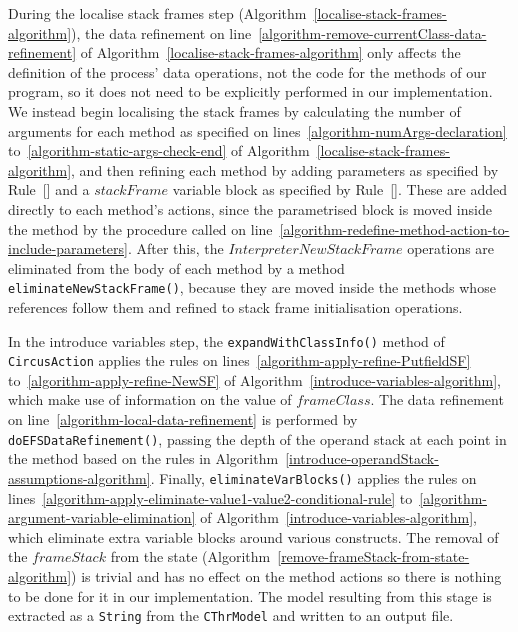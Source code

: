 During the localise stack frames step
(Algorithm~\ref{localise-stack-frames-algorithm}), the data refinement
on line~\ref{algorithm-remove-currentClass-data-refinement} of
Algorithm~\ref{localise-stack-frames-algorithm} only affects the
definition of the process' data operations, not the \Circus{} code for
the methods of our program, so it does not need to be explicitly
performed in our implementation.
We instead begin localising the stack frames by calculating the number
of arguments for each method as specified on
lines~\ref{algorithm-numArgs-declaration}
to~\ref{algorithm-static-args-check-end} of
Algorithm~\ref{localise-stack-frames-algorithm}, and then refining
each method by adding parameters as specified by
Rule~[] and a $stackFrame$
variable block as specified by
Rule~[].
These are added directly to each method's actions, since the
parametrised block is moved inside the method by the procedure called
on line~\ref{algorithm-redefine-method-action-to-include-parameters}.
After this, the $InterpreterNewStackFrame$ operations are eliminated
from the body of each method by a method
\texttt{eliminateNewStackFrame()}, because they are moved inside
the methods whose references follow them and refined to stack frame
initialisation operations.

In the introduce variables step, the \texttt{expandWithClassInfo()}
method of \texttt{CircusAction} applies the rules on
lines~\ref{algorithm-apply-refine-PutfieldSF}
to~\ref{algorithm-apply-refine-NewSF} of
Algorithm~\ref{introduce-variables-algorithm}, which make use of
information on the value of $frameClass$.
The data refinement on line~\ref{algorithm-local-data-refinement} is
performed by \texttt{doEFSDataRefinement()}, passing the depth of the
operand stack at each point in the method based on the rules in
Algorithm~\ref{introduce-operandStack-assumptions-algorithm}.
Finally, \texttt{eliminateVarBlocks()} applies the rules on
lines~\ref{algorithm-apply-eliminate-value1-value2-conditional-rule}
to~\ref{algorithm-argument-variable-elimination} of
Algorithm~\ref{introduce-variables-algorithm}, which eliminate extra
variable blocks around various constructs.
The removal of the $frameStack$ from the state
(Algorithm~\ref{remove-frameStack-from-state-algorithm}) is trivial
and has no effect on the method actions so there is nothing to be done
for it in our implementation.
The \Circus{} model resulting from this stage is extracted as a
\texttt{String} from the \texttt{CThrModel} and written to an output
file.

